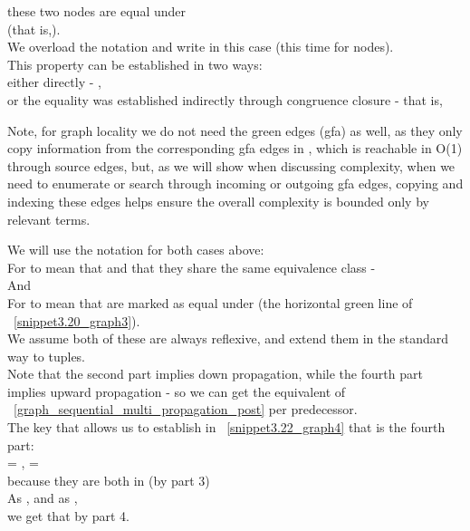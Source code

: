 these two nodes are equal under  \\
(that is,).\\
We overload the notation and write  in this case (this time for  nodes).\\
This property can be established in two ways:\\
either directly - , \\
or the equality was established indirectly through congruence closure - that is, \\

Note, for graph locality we do not need the green edges (gfa) as well, as they only copy information from the corresponding gfa edges in , which is reachable in O(1) through source edges, but, as we will show when discussing complexity, when we need to enumerate or search through incoming or outgoing gfa edges, copying and indexing these edges helps ensure the overall complexity is bounded only by relevant terms.

We will use the notation  for both cases above:\\
For  to mean that  and that they share the same  equivalence class -\\
And\\
For  to mean that  are marked as equal under  (the horizontal green line of ~\ref{snippet3.20_graph3}).\\
We assume both of these are always reflexive, and extend them in the standard way to tuples.\\


Note that the second part implies down propagation, while the fourth part implies upward propagation - 
so we can get the equivalent of ~\ref{graph_sequential_multi_propagation_post} per predecessor.\\
The key that allows us to establish in  ~\ref{snippet3.22_graph4} that 
is the fourth part:\\
 = ,  =  \\
 because they are both in  (by part 3)\\
As , and as \m{g([c]_{p_0}) \in \gfasA{[g(c)_{p_0}}}, \\
we get that  by part 4.

